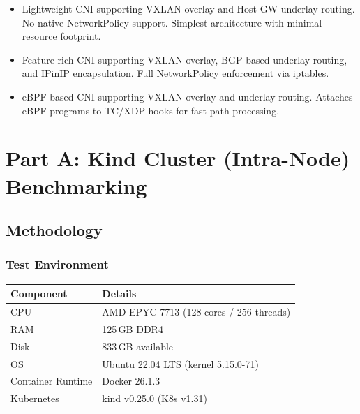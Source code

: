 \documentclass[11pt,a4paper]{article}
\begin{document}
\begin{itemize}[leftmargin=2cm]
  \item[\textcolor{BrandColor}{\textbf{Flannel}}] Lightweight CNI supporting VXLAN overlay and Host-GW underlay routing. No native NetworkPolicy support. Simplest architecture with minimal resource footprint.
  \item[\textcolor{red!70!black}{\textbf{Calico}}] Feature-rich CNI supporting VXLAN overlay, BGP-based underlay routing, and IPinIP encapsulation. Full NetworkPolicy enforcement via iptables.
  \item[\textcolor{cyan!60!black}{\textbf{Cilium}}] eBPF-based CNI supporting VXLAN overlay and underlay routing. Attaches eBPF programs to TC/XDP hooks for fast-path processing. 
\end{itemize}


\newpage
\section{Part A: Kind Cluster (Intra-Node) Benchmarking}

\subsection{Methodology}

\subsubsection{Test Environment}

\begin{infobox}
\begin{tabularx}{\textwidth}{lX}
  \toprule
  \textbf{Component} & \textbf{Details} \\
  \midrule
  CPU & AMD EPYC 7713 (128 cores / 256 threads) \\
  RAM & 125\,GB DDR4 \\
  Disk & 833\,GB available \\
  OS & Ubuntu 22.04 LTS (kernel 5.15.0-71) \\
  Container Runtime & Docker 26.1.3 \\
  Kubernetes & kind v0.25.0 (K8s v1.31) \\
  \bottomrule
\end{tabularx}
\end{infobox}
\end{document}

